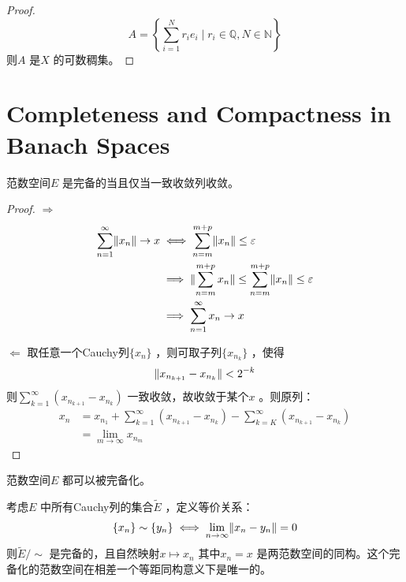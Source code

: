 \begin{proof}
    \[
        A = \left\{ \sum_{i=1}^{N} r_{i} e_{i} \mid r_{i} \in
        \mathbb{Q}, N \in \mathbb{N} \right\}
    \]
    则\(A\) 是\(X\) 的可数稠集。
\end{proof}

\section{Completeness and Compactness in Banach Spaces}

\begin{theorem}
    范数空间\(E\) 是完备的当且仅当一致收敛列收敛。
\end{theorem}

\begin{proof}
    \textbf{\(\Rightarrow\) }
    \begin{align*}
        \sum_{n=1}^{\infty} \lVert x_{n}\rVert \to x
        &\iff \sum_{n=m}^{m+p} \lVert x_{n}\rVert \leq \varepsilon \\
        &\implies \lVert\sum_{n=m}^{m+p} x_{n}\rVert \leq \sum_{n=m}^{m+p}
        \lVert x_{n}\rVert \leq \varepsilon \\
        &\implies \sum_{n=1}^{\infty} x_{n} \to x
    \end{align*}

    \textbf{\(\Leftarrow\) }
    取任意一个Cauchy列\(\{x_{n}\}\) ，则可取子列\(\{x_{n_{k}}\}\) ，使得
    \[\lVert x_{n_{k+1}} - x_{n_{k}}\rVert < 2^{-k}\]
    则\(\sum_{k=1}^{\infty}
    (x_{n_{k+1}} - x_{n_{k}})\) 一致收敛，故收敛于某个\(x\) 。则原列：
    \begin{align*}
        x_{n} &= x_{n_{1}} + \sum_{k=1}^{\infty} (x_{n_{k+1}} - x_{n_{k}}) -
        \sum_{k=K}^{\infty} (x_{n_{k+1}} - x_{n_{k}}) \\
        &= \lim_{m \to \infty} x_{n_{m}}
    \end{align*}
\end{proof}

\begin{corollary}[Banach空间完备化定理]
    范数空间\(E\) 都可以被完备化。

    考虑\(E\) 中所有Cauchy列的集合\(\tilde{E}\) ，定义等价关系：
    \[
        \{x_{n}\} \sim \{y_{n}\} \iff \lim_{n \to \infty} \lVert x_{n}
        - y_{n}\rVert = 0
    \]
    则\(\tilde{E}/\sim\) 是完备的，且自然映射\(x\mapsto {x_{n}}\) 其中\(x_{n} = x\)
    是两范数空间的同构。这个完备化的范数空间在相差一个等距同构意义下是唯一的。
\end{corollary}

